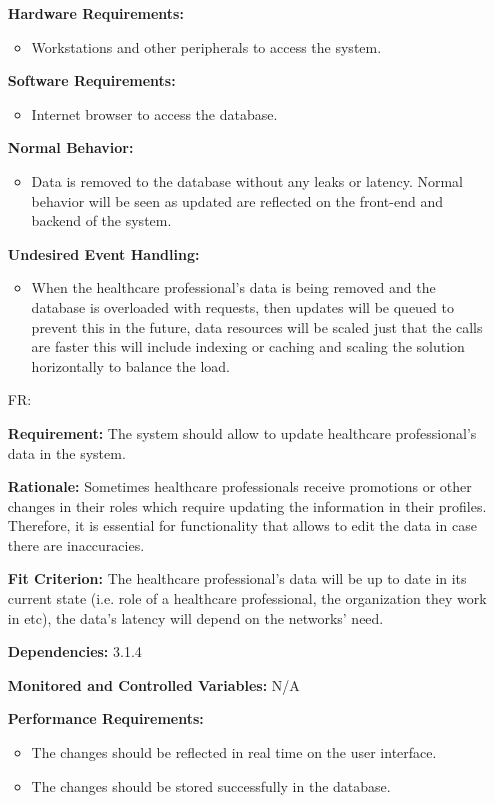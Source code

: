 \documentclass[12pt]{article}
\newcounter{reqnum} %
\begin{document}
\begin{itemize}
\textbf{Hardware Requirements:}
\begin{itemize}
  \item Workstations and other peripherals to access the system.
\end{itemize} 

\textbf{Software Requirements:}
\begin{itemize}
  \item Internet browser to access the database.
\end{itemize} 

\textbf{Normal Behavior:}
\begin{itemize}
  \item Data is removed to the database without any leaks or latency. Normal behavior will be seen as updated are reflected on the front-end and backend of the system.
\end{itemize} 

\textbf{Undesired Event Handling:}
\begin{itemize}
  \item When the healthcare professional’s data is being removed and the database is overloaded with requests, then updates will be queued to prevent this in the future, data resources will be scaled just that the calls are faster this will include indexing or caching and scaling the solution horizontally to balance the load.
\end{itemize} 

\item[FR\refstepcounter{reqnum}\thereqnum \label{FR_UpdateHealthProfessionals}:]

\textbf{Requirement:} The system should allow to update healthcare professional’s data in the system.

\textbf{Rationale:} Sometimes healthcare professionals receive promotions or other changes in their roles which require updating the information in their profiles. Therefore, it is essential for functionality that allows to edit the data in case there are inaccuracies.  

\textbf{Fit Criterion:} The healthcare professional’s data will be up to date in its current state (i.e. role of a healthcare professional, the organization they work in etc), the data’s latency will depend on the networks’ need. 

\textbf{Dependencies:} 3.1.4 

\textbf{Monitored and Controlled Variables:} N/A

\textbf{Performance Requirements:} 
\begin{itemize}
  \item The changes should be reflected in real time on the user interface.
  \item The changes should be stored successfully in the database.
\end{itemize} 


\end{itemize}
\end{document}
